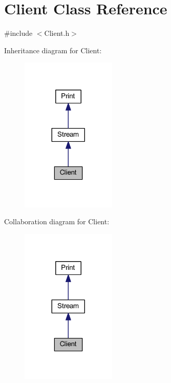 \hypertarget{class_client}{}\section{Client Class Reference}
\label{class_client}


{\ttfamily \#include $<$Client.\+h$>$}



Inheritance diagram for Client\+:\nopagebreak
\begin{figure}[H]
\begin{center}
\leavevmode
\includegraphics[width=128pt]{class_client__inherit__graph}
\end{center}
\end{figure}


Collaboration diagram for Client\+:\nopagebreak
\begin{figure}[H]
\begin{center}
\leavevmode
\includegraphics[width=128pt]{class_client__coll__graph}
\end{center}
\end{figure}
